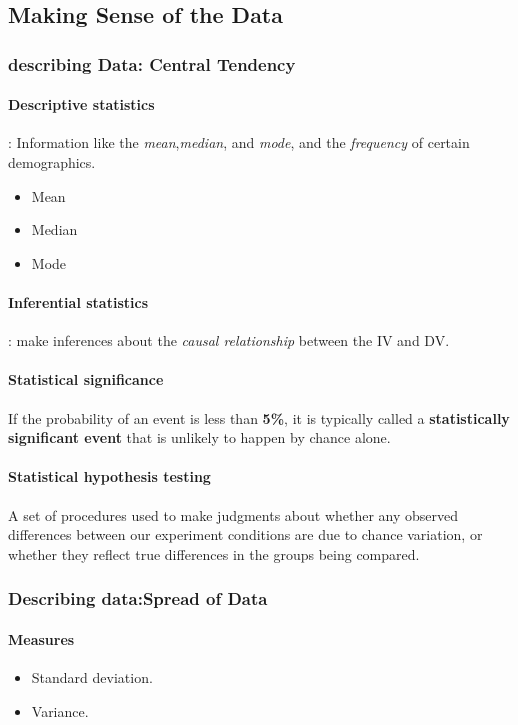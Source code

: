 \documentclass{article}
\begin{document}
\begin{figure}[H]
 	\end{figure}

 	\subsection{Making Sense of the Data}
 	\subsubsection{describing Data: Central Tendency}
 	\paragraph{Descriptive statistics}: Information like the \emph{mean},\emph{median}, and \emph{mode}, and the \emph{frequency} of certain demographics.
 	\begin{itemize}
 		\item Mean
 		\item Median
 		\item Mode
 	\end{itemize}
 	\paragraph{Inferential statistics}: make inferences about the \emph{causal relationship} between the IV and DV.
 	\paragraph{Statistical significance} If the probability of an event is less than \textbf{5\%}, it is typically called a \textbf{statistically significant event} that is unlikely to happen by chance alone.
 	\paragraph{Statistical hypothesis testing} A set of procedures used to make judgments about whether any observed differences between our experiment conditions are due to chance variation, or whether they reflect true differences in the groups being compared.
 	\subsubsection{Describing data:Spread of Data}
 	\paragraph{Measures}
 	\begin{itemize}
 		\item Standard deviation.
 		\item Variance.
 	\end{itemize}
\end{document}
